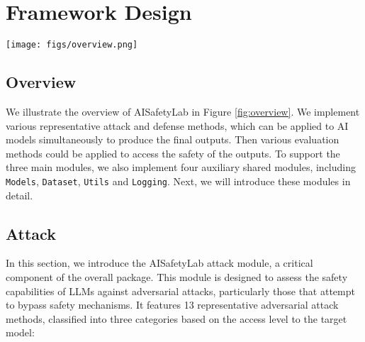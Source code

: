 \section{Framework Design}
\begin{figure*}[!t]
    \centering
    \texttt{[image: figs/overview.png]}
    \caption{An overview of AISafetyLab. We introduce three core modules encompassing various attack, defense and evaluation methods. To support their implementation, we incorporate four shared auxiliary modules.}
    \label{fig:overview}
\end{figure*}

\subsection{Overview}
We illustrate the overview of AISafetyLab in Figure \ref{fig:overview}. We implement various representative attack and defense methods, which can be applied to AI models simultaneously to produce the final outputs. Then various evaluation methods could be applied to access the safety of the outputs. To support the three main modules, we also implement four auxiliary shared modules, including \texttt{Models}, \texttt{Dataset}, \texttt{Utils} and \texttt{Logging}. Next, we will introduce these modules in detail. 

\subsection{Attack}
\label{appsec:overview_attack}
In this section, we introduce the AISafetyLab attack module, a critical component of the overall package. This module is designed to assess the safety capabilities of LLMs against adversarial attacks, particularly those that attempt to bypass safety mechanisms. It features 13 representative adversarial attack methods, classified into three categories based on the access level to the target model:

